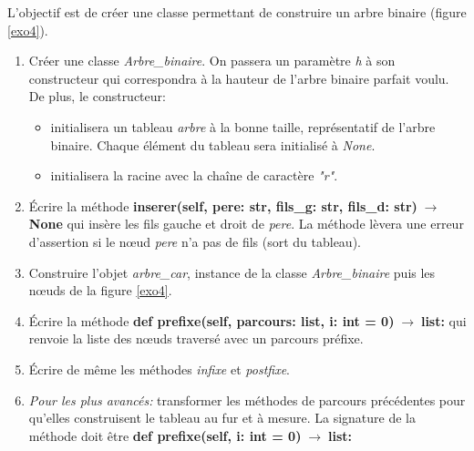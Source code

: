 \documentclass[a4paper,11pt]{article}
\begin{document}
\begin{Form}
\begin{exo}
\begin{center}
\label{exo4}
\end{center}
L'objectif est de créer une classe permettant de construire un arbre binaire (figure \ref{exo4}).
\begin{enumerate}
\item Créer une classe \emph{Arbre\_binaire}. On passera un paramètre \emph{h} à son constructeur qui correspondra à la hauteur de l'arbre binaire parfait voulu. De plus, le constructeur:
\begin{itemize}
\item initialisera un tableau \emph{arbre} à la bonne taille, représentatif de l'arbre binaire. Chaque élément du tableau sera initialisé à \emph{None}.
\item initialisera la racine avec la chaîne de caractère \emph{"r"}. 
\end{itemize}
\item Écrire la méthode \textbf{inserer(self, pere: str, fils\_g: str, fils\_d: str)$\;\rightarrow\;$None} qui insère les fils gauche et droit de \emph{pere}. La méthode lèvera une erreur d'assertion si le nœud \emph{pere} n'a pas de fils (sort du tableau).
\item Construire l'objet \emph{arbre\_car}, instance de la classe \emph{Arbre\_binaire} puis les nœuds de la figure \ref{exo4}.
\item Écrire la méthode \textbf{def prefixe(self, parcours: list, i: int = 0)$\;\rightarrow\;$list:} qui renvoie la liste des nœuds traversé avec un parcours préfixe.
\item Écrire de même les méthodes \emph{infixe} et \emph{postfixe}.
\item \emph{Pour les plus avancés:} transformer les méthodes de parcours précédentes pour qu'elles construisent le tableau au fur et à mesure. La signature de la méthode doit être \textbf{def prefixe(self, i: int = 0)$\;\rightarrow\;$list:}
\end{enumerate}
\end{exo}
\end{Form}
\end{document}
